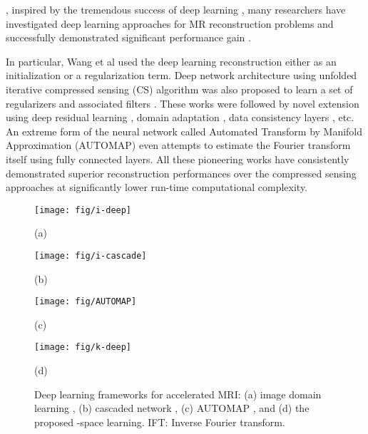 \documentclass[10pt,journal]{IEEEtran}
\newcommand{\0}{{\boldsymbol{0}}}
\begin{document}
, 
inspired by the tremendous success of deep learning \cite{krizhevsky2012imagenet,he2016deep,ronneberger2015u}, 
many researchers have investigated deep learning approaches  for MR reconstruction problems
and successfully demonstrated significant performance gain
\cite{wang2016accelerating,hammernik2018learning,lee2018deep,han2017deep,jin2017deep,schlemper2018deep,zhu2018image}.


In particular,
Wang et al \cite{wang2016accelerating}  used the deep learning reconstruction either as  an initialization  or  a  regularization term.
Deep network architecture using unfolded iterative compressed sensing (CS) algorithm was also proposed   to learn a set of  regularizers and associated filters
\cite{hammernik2018learning}. 
These works were followed by novel
extension using deep residual learning \cite{lee2018deep}, domain adaptation \cite{han2017deep}, data consistency layers \cite{schlemper2018deep}, etc. An extreme form of the neural network called Automated Transform by Manifold Approximation
(AUTOMAP) \cite{zhu2018image} even attempts to estimate the Fourier transform itself using fully connected layers.
All these pioneering works have consistently demonstrated superior reconstruction performances over the compressed sensing approaches \cite{lustig2007sparse,jung2009k,shin2014calibrationless,haldar2014low,jin2016general,ongie2016off}
at significantly lower run-time computational complexity.


\begin{figure}[!hbt] 	
\centerline{\texttt{[image: fig/i-deep]}}
\vspace{-0.4cm}
\centerline{\mbox{(a)}}
\vspace{0.5cm}
\centerline{\texttt{[image: fig/i-cascade]}}
\vspace{-0.4cm}
\centerline{\mbox{(b)}}
\centerline{\texttt{[image: fig/AUTOMAP]}}
\vspace{-0.4cm}
\centerline{\mbox{(c)}}
\centerline{\texttt{[image: fig/k-deep]}}
\vspace{-0.4cm}
\centerline{\mbox{(d)}}
\caption{Deep learning frameworks for accelerated MRI: (a) image domain learning  \cite{lee2018deep,han2017deep}, (b) cascaded network \cite{hammernik2018learning,wang2016accelerating,schlemper2018deep}, (c) AUTOMAP \cite{zhu2018image},
and (d) the proposed -space learning.  IFT: Inverse Fourier transform. }
\vspace*{-0.5cm}
\label{fig:deepMR}
\end{figure}
\end{document}
